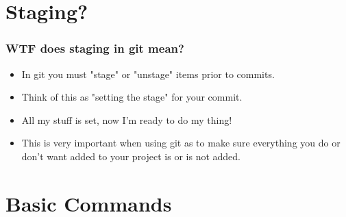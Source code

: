\documentclass{beamer}
\begin{document}
\section{Staging?}
\begin{frame}
    \frametitle{WTF does staging in git mean?}
    \begin{itemize}
        \item{In git you must "stage" or "unstage" items prior to commits.}
        \item{Think of this as "setting the stage" for your commit.}
        \item{All my stuff is set, now I'm ready to do my thing!}
        \item{This is very important when using git as to make sure everything you do or don't want added to your project is or is not added.}
    \end{itemize}
\end{frame}

\section{Basic Commands}
\end{document}

